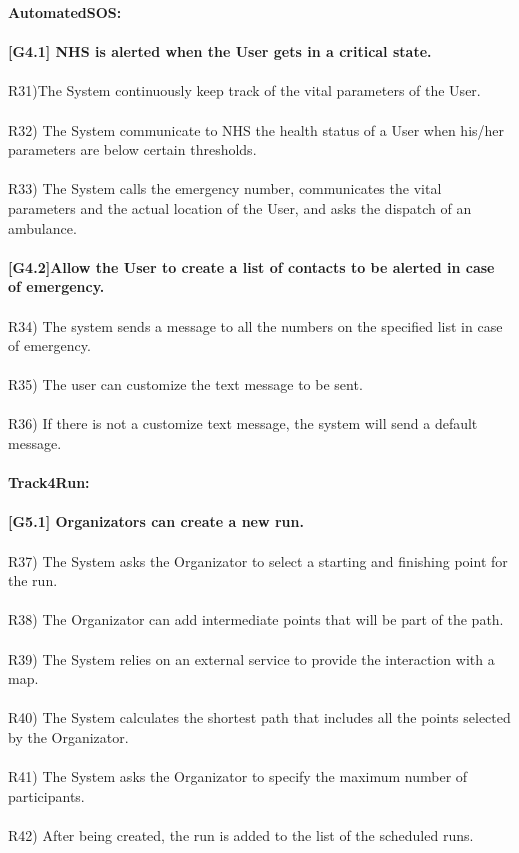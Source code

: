 \textbf{AutomatedSOS:} \\ \\ 
\textbf{[G4.1] NHS is alerted when the User gets in a critical state.} \\ \\
R31)The System continuously keep track of the vital parameters of the User. \\ \\
R32) The System communicate to NHS the health status of a User when his/her parameters are below certain thresholds. \\ \\
R33) The System calls the emergency number, communicates the vital parameters and the actual location of the User, and asks the dispatch of an ambulance. \\ \\

\textbf{[G4.2]Allow the User to create a list of contacts to be alerted in case of emergency.} \\ \\
R34) The system sends a message to all the numbers on the specified list in case of emergency. \\ \\
R35) The user can customize the  text message to be sent. \\ \\
R36) If there is not a customize text message, the system will send a default message. \\ \\

\textbf{Track4Run:}\\ \\
\textbf{[G5.1] Organizators can create a new run.} \\ \\
R37) The System asks the Organizator to select a starting and finishing point for the run. \\ \\
R38) The Organizator can add intermediate points that will be part of the path. \\ \\
R39) The System relies on an external service to provide the interaction with a map. \\ \\
R40) The System calculates the shortest path that includes all the points selected by the Organizator. \\ \\   
R41) The System asks the Organizator to specify the maximum number of participants. \\ \\
R42) After being created, the run is added to the list of the scheduled runs. \\ \\

